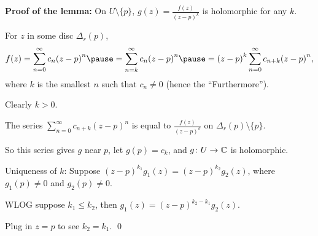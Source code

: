 \documentclass[10pt,aspectratio=169]{beamer}
\begin{document}
\begin{frame}
\textbf{Proof of the lemma:}
On $U \setminus \{ p \}$, $g(z) = \frac{f(z)}{{(z-p)}^k}$ is
holomorphic for any $k$.

\medskip
\pause

For $z$ in some disc $\Delta_r(p)$,
\[
f(z)
=
\sum_{n=0}^\infty c_n {(z-p)}^n
\pause
=
\sum_{n=k}^\infty c_n {(z-p)}^n 
\pause
= {(z-p)}^k
\sum_{n=0}^\infty c_{n+k} {(z-p)}^{n} ,
\]
\pause
where $k$ is the smallest $n$ such that $c_n \not= 0$ (hence the ``Furthermore'').

\medskip
\pause

Clearly $k > 0$.

\medskip
\pause

The series $\sum_{n=0}^\infty c_{n+k}{(z-p)}^n$
is equal to $\frac{f(z)}{{(z-p)}^k}$ on
$\Delta_r(p)\setminus \{ p \}$.

\medskip
\pause

So this series gives $g$ near $p$, let $g(p)=c_k$, and $g \colon U \to {\mathbb{C}}$ is 
holomorphic.

\medskip
\pause

Uniqueness of $k$:
\pause
Suppose ${(z-p)}^{k_1} g_1(z) = {(z-p)}^{k_2} g_2(z)$, where
$g_1(p) \not= 0$ and $g_2(p) \not= 0$.

\medskip
\pause

WLOG suppose $k_1 \leq k_2$,
\pause
then $g_1(z) = {(z-p)}^{k_2-k_1} g_2(z)$.

\medskip
\pause

Plug in $z=p$ to see $k_2 = k_1$.
\qed
\end{frame}
\end{document}
